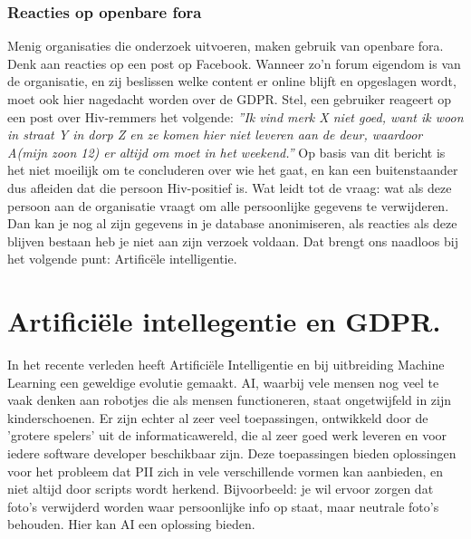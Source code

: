 \subsubsection{Reacties op openbare fora}
Menig organisaties die onderzoek uitvoeren, maken gebruik van openbare fora. Denk aan reacties op een post op Facebook. Wanneer zo'n forum eigendom is van de organisatie, en zij beslissen welke content er online blijft en opgeslagen wordt, moet ook hier nagedacht worden over de GDPR. Stel, een gebruiker reageert op een post over Hiv-remmers het volgende: \textit{”Ik vind merk X niet goed, want ik woon in straat Y in dorp Z en ze komen hier niet leveren aan de deur, waardoor A(mijn zoon 12) er altijd om moet in het weekend.”}
Op basis van dit bericht is het niet moeilijk om te concluderen over wie het gaat, en kan een buitenstaander dus afleiden dat die persoon Hiv-positief is. Wat leidt tot de vraag: wat als deze persoon aan de organisatie vraagt om alle persoonlijke gegevens te verwijderen. Dan kan je nog al zijn gegevens in je database anonimiseren, als reacties als deze blijven bestaan heb je niet aan zijn verzoek voldaan. Dat brengt ons naadloos bij het volgende punt: Artificële intelligentie. 

\section{Artificiële intellegentie en GDPR.}
In het recente verleden heeft Artificiële Intelligentie en bij uitbreiding Machine Learning een geweldige evolutie gemaakt. AI, waarbij vele mensen nog veel te vaak denken aan robotjes die als mensen functioneren, staat ongetwijfeld in zijn kinderschoenen. Er zijn echter al zeer veel toepassingen, ontwikkeld door de 'grotere spelers' uit de informaticawereld, die al zeer goed werk leveren en voor iedere software developer beschikbaar zijn. Deze toepassingen bieden oplossingen voor het probleem dat PII zich in vele verschillende vormen kan aanbieden, en niet altijd door scripts wordt herkend.  Bijvoorbeeld: je wil ervoor zorgen dat foto's verwijderd worden waar persoonlijke info op staat, maar neutrale foto's behouden. Hier kan AI een oplossing bieden. 

